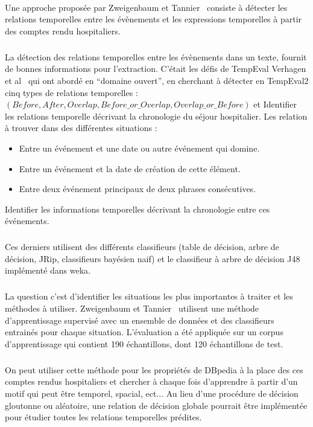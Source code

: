 \documentclass[12pt,a4	]{report}
\begin{document}
\paragraph{}
Une approche proposée par Zweigenbaum et Tannier~\cite{zweigenbaum2013} consiste à détecter les relations temporelles entre les évènements et les expressions temporelles à partir des comptes rendu hospitaliers.
\subparagraph{}
La détection des relations temporelles entre les évènements dans un texte, fournit de bonnes informations pour l’extraction.
\newline
C’était les défis de TempEval Verhagen et al~\cite{verhagen2010} qui ont abordé en “domaine ouvert”, en cherchant à détecter en TempEval2 cinq types de relations temporelles :
\newline
$(Before, After, Overlap, Before\_or\_Overlap, Overlap\_or\_Before)$
et Identifier les relations temporelle décrivant la chronologie du séjour hospitalier.
\newline
Les relation à trouver dans des différentes situations :
\begin{itemize}
\item{}Entre un événement et une date ou autre événement qui domine.
\item{}Entre un événement et la date de création de cette élément.
\item{}Entre deux événement principaux de deux phrases consécutives.
\end{itemize}
Identifier les informations temporelles décrivant la chronologie entre ces événements.
\subparagraph{}
Ces derniers utilisent des différents classifieurs (table de décision, arbre de décision, JRip, classifieurs bayésien naif) et le classifieur à arbre de décision J48 implémenté dans weka.
\subparagraph{}
La question c’est d’identifier les situations les plus importantes à traiter et les méthodes à utiliser.
Zweigenbaum et Tannier~\cite{zweigenbaum2013} utilisent une méthode d’apprentissage supervisé avec un ensemble de données et des classifieurs entrainés pour chaque situation.
L'évaluation a été appliquée sur un corpus d’apprentissage qui contient 190 échantillons, dont 120 échantillons de test.
\subparagraph{}
On peut utiliser cette méthode pour les propriétés de DBpedia à la place des ces comptes rendus hospitaliers et chercher à chaque fois d'apprendre à partir d'un motif qui peut être temporel, spacial, ect...
Au lieu d’une procédure de décision gloutonne ou aléatoire, une relation de décision globale pourrait être implémentée pour étudier toutes les relations temporelles prédites.
\end{document}
